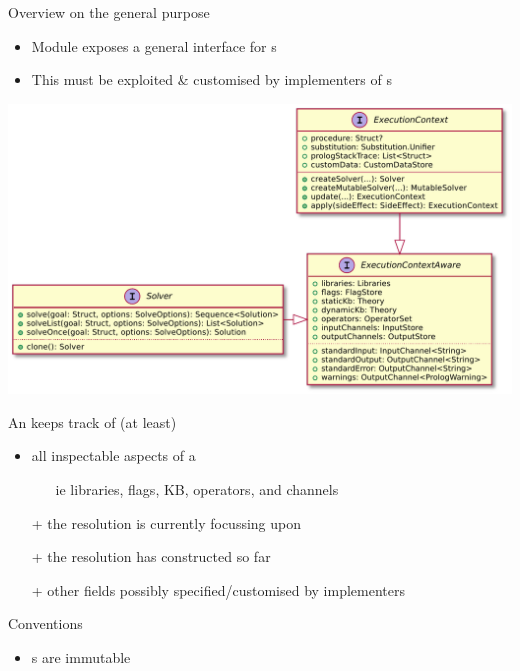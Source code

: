 \documentclass[handout]{beamer}
\begin{document}
\begin{frame}[allowframebreaks]{Overview on the general purpose }
    \begin{itemize}
        \item Module  exposes a general interface for s
        \item This must be exploited \& customised by implementers of s
    \end{itemize}
    \begin{center}
        \includegraphics[width=.6\linewidth]{img/solve-ec.pdf}
    \end{center}

    \framebreak

    \begin{block}{An  keeps track of (at least)}
        \begin{itemize}
            \item all inspectable aspects of a 
            \begin{itemize}
                \item[ie] libraries, flags, KB, operators, and channels
            \end{itemize}
            \item[+] the \alert{} resolution is currently focussing upon
            \item[+] the \alert{} resolution has constructed so far 
            \item[+] other fields possibly specified/customised by implementers
        \end{itemize}
    \end{block}

    \framebreak

    \begin{alertblock}{Conventions}
        \begin{itemize}
            \item {}s are \alert{immutable}
            

\end{itemize}
\end{alertblock}
\end{frame}
\end{document}
